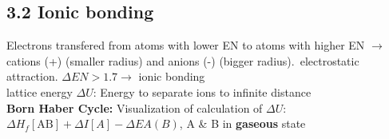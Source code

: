 \subsection{3.2 Ionic bonding}
    Electrons transfered from atoms with lower EN to atoms with higher EN $\rightarrow$ cations (+) (smaller radius) and anions (-) (bigger radius).\ electrostatic attraction. $\Delta EN > 1.7 \rightarrow$ ionic bonding\\
    lattice energy $\Delta U$: Energy to separate ions to infinite distance\\
    \textbf{Born Haber Cycle:} Visualization of calculation of $\Delta U$: $\Delta H_f[\text{AB}] + \Delta I[A] - \Delta EA(B)$, A \& B in \textbf{gaseous} state